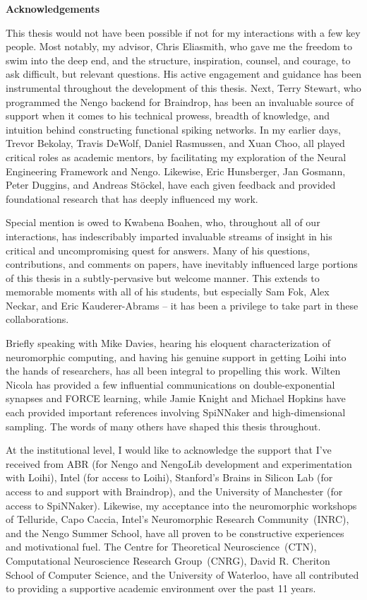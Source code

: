 \begin{center}\textbf{Acknowledgements}\end{center}

\noindent
This thesis would not have been possible if not for my interactions with a few key people.
Most notably, my advisor, Chris Eliasmith, who gave me the freedom to swim into the deep end, and the structure, inspiration, counsel, and courage, to ask difficult, but relevant questions.
His active engagement and guidance has been instrumental throughout the development of this thesis.
Next, Terry Stewart, who programmed the Nengo backend for Braindrop, has been an invaluable source of support when it comes to his technical prowess, breadth of knowledge, and intuition behind constructing functional spiking networks.
In my earlier days, Trevor Bekolay, Travis DeWolf, Daniel Rasmussen, and Xuan Choo, all played critical roles as academic mentors, by facilitating my exploration of the Neural Engineering Framework and Nengo.
Likewise, Eric Hunsberger, Jan Gosmann, Peter Duggins, and Andreas St{\"o}ckel, have each given feedback and provided foundational research that has deeply influenced my work.

Special mention is owed to Kwabena Boahen, who, throughout all of our interactions, has indescribably imparted invaluable streams of insight in his critical and uncompromising quest for answers.
Many of his questions, contributions, and comments on papers, have inevitably influenced large portions of this thesis in a subtly-pervasive but welcome manner.
This extends to memorable moments with all of his students, but especially Sam Fok, Alex Neckar, and Eric Kauderer-Abrams -- it has been a privilege to take part in these collaborations.

Briefly speaking with Mike Davies, hearing his eloquent characterization of neuromorphic computing, and having his genuine support in getting Loihi into the hands of researchers, has all been integral to propelling this work.
Wilten Nicola has provided a few influential communications on double-exponential synapses and FORCE learning, while Jamie Knight and Michael Hopkins have each provided important references involving SpiNNaker and high-dimensional sampling.
The words of many others have shaped this thesis throughout.

At the institutional level, I would like to acknowledge the support that I've received from
ABR (for Nengo and NengoLib development and experimentation with Loihi),
Intel (for access to Loihi),
Stanford's Brains in Silicon Lab (for access to and support with Braindrop),
and the University of Manchester (for access to SpiNNaker).
Likewise, my acceptance into the neuromorphic workshops of Telluride, Capo Caccia, Intel's Neuromorphic Research Community~(INRC), and the Nengo Summer School, have all proven to be constructive experiences and motivational fuel.
The Centre for Theoretical Neuroscience~(CTN), Computational Neuroscience Research Group~(CNRG), David R. Cheriton School of Computer Science, and the University of Waterloo, have all contributed to providing a supportive academic environment over the past 11 years.  

